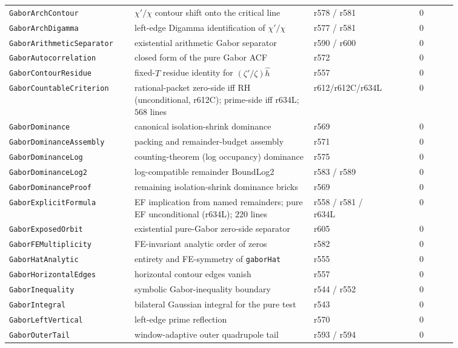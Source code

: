 \documentclass[11pt]{article}
\theoremstyle{definition}
\theoremstyle{remark}
\begin{document}
\begin{longtable}{@{}
  >{\raggedright\arraybackslash}p{0.28\linewidth}
  >{\raggedright\arraybackslash}p{0.40\linewidth}
  >{\raggedright\arraybackslash}p{0.18\linewidth}
  c@{}}
\texttt{GaborArchContour} & $\chi'/\chi$ contour shift onto the critical line & r578 / r581 & 0\\
\texttt{GaborArchDigamma} & left-edge Digamma identification of $\chi'/\chi$ & r577 / r581 & 0\\
\texttt{GaborArithmeticSeparator} & existential arithmetic Gabor separator & r590 / r600 & 0\\
\texttt{GaborAutocorrelation} & closed form of the pure Gabor ACF & r572 & 0\\
\texttt{GaborContourResidue} & fixed-$T$ residue identity for $(\zeta'/\zeta)\hat h$ & r557 & 0\\
\texttt{GaborCountableCriterion} & rational-packet zero-side iff RH (unconditional, r612C); prime-side iff r634L; $568$ lines & r612/r612C/r634L & 0\\
\texttt{GaborDominance} & canonical isolation-shrink dominance & r569 & 0\\
\texttt{GaborDominanceAssembly} & packing and remainder-budget assembly & r571 & 0\\
\texttt{GaborDominanceLog} & counting-theorem (log occupancy) dominance & r575 & 0\\
\texttt{GaborDominanceLog2} & log-compatible remainder BoundLog2 & r583 / r589 & 0\\
\texttt{GaborDominanceProof} & remaining isolation-shrink dominance bricks & r569 & 0\\
\texttt{GaborExplicitFormula} & EF implication from named remainders; pure EF unconditional (r634L); $220$ lines & r558 / r581 / r634L & 0\\
\texttt{GaborExposedOrbit} & existential pure-Gabor zero-side separator & r605 & 0\\
\texttt{GaborFEMultiplicity} & FE-invariant analytic order of zeros & r582 & 0\\
\texttt{GaborHatAnalytic} & entirety and FE-symmetry of \texttt{gaborHat} & r555 & 0\\
\texttt{GaborHorizontalEdges} & horizontal contour edges vanish & r557 & 0\\
\texttt{GaborInequality} & symbolic Gabor-inequality boundary & r544 / r552 & 0\\
\texttt{GaborIntegral} & bilateral Gaussian integral for the pure test & r543 & 0\\
\texttt{GaborLeftVertical} & left-edge prime reflection & r570 & 0\\
\texttt{GaborOuterTail} & window-adaptive outer quadrupole tail & r593 / r594 & 0\\

\end{longtable}
\end{document}
